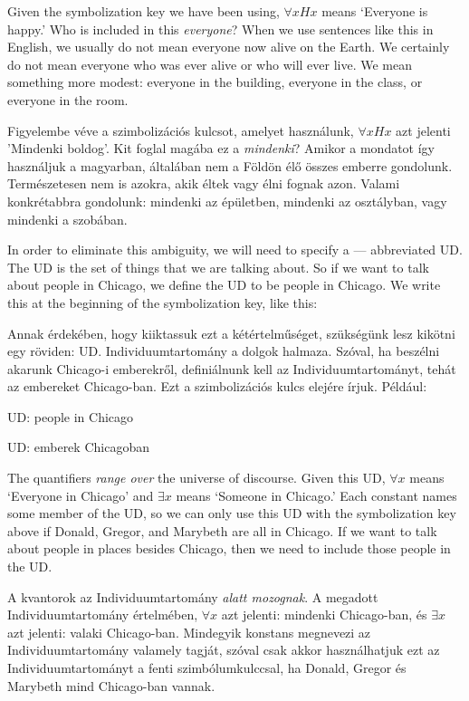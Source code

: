Given the symbolization key we have been using, $\forall xHx$ means `Everyone is happy.' Who is included in this \emph{everyone}? When we use sentences like this in English, we usually do not mean everyone now alive on the Earth. We certainly do not mean everyone who was ever alive or who will ever live. We mean something more modest: everyone in the building, everyone in the class, or everyone in the room.

Figyelembe véve a szimbolizációs kulcsot, amelyet használunk, $\forall xHx$ azt jelenti ’Mindenki boldog’. Kit foglal magába ez a \emph{mindenki}? Amikor a mondatot így használjuk a magyarban, általában nem a Földön élő összes emberre gondolunk. Természetesen nem is azokra, akik éltek vagy élni fognak azon. Valami konkrétabbra gondolunk: mindenki az épületben, mindenki az osztályban, vagy mindenki a szobában.

In order to eliminate this ambiguity, we will need to specify a --- abbreviated UD. The UD is the set of things that we are talking about. So if we want to talk about people in Chicago, we define the UD to be people in Chicago. We write this at the beginning of the symbolization key, like this:

Annak érdekében, hogy kiiktassuk ezt a kétértelműséget, szükségünk lesz kikötni egy  röviden: UD. Individuumtartomány a dolgok halmaza.  Szóval, ha beszélni akarunk Chicago-i emberekről, definiálnunk kell az Individuumtartományt, tehát az embereket Chicago-ban. Ezt a szimbolizációs kulcs elejére írjuk. Például:

\begin{ekey}
\item[UD:] people in Chicago
\item[UD:] emberek Chicagoban
\end{ekey}

The quantifiers \emph{range over} the universe of discourse. Given this UD, $\forall x$ means `Everyone in Chicago' and $\exists x$ means `Someone in Chicago.' Each constant names some member of the UD, so we can only use this UD with the symbolization key above if Donald, Gregor, and Marybeth are all in Chicago. If we want to talk about people in places besides Chicago, then we need to include those people in the UD.

A kvantorok az Individuumtartomány \emph{alatt mozognak}. A megadott Individuumtartomány értelmében, $\forall x$ azt jelenti: mindenki Chicago-ban, és $\exists x$ azt jelenti: valaki Chicago-ban. Mindegyik konstans megnevezi az Individuumtartomány valamely tagját, szóval csak akkor használhatjuk ezt az Individuumtartományt a fenti szimbólumkulccsal, ha Donald, Gregor és Marybeth mind Chicago-ban vannak.

